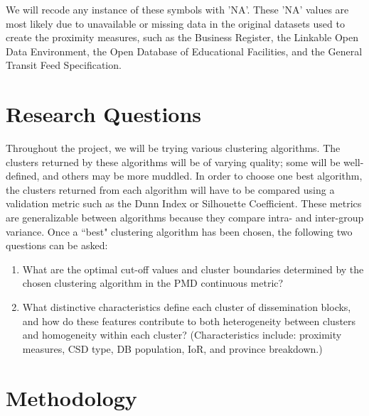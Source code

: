\documentclass[11pt, a4paper]{article}
\newcommand{\comment}[1]{}
\begin{document}
We will recode any instance of these symbols with 'NA'. These 'NA' values are most likely due to unavailable or missing data in the original datasets used to create the proximity measures, such as the Business Register, the Linkable Open Data Environment, the Open Database of Educational Facilities, and the General Transit Feed Specification. 



\section*{Research Questions}

Throughout the project, we will be trying various clustering algorithms. The clusters returned by these algorithms will be of varying quality; some will be well-defined, and others may be more muddled. In order to choose one best algorithm, the clusters returned from each algorithm will have to be compared using a validation metric such as the Dunn Index or Silhouette Coefficient. These metrics are generalizable between algorithms because they compare intra- and inter-group variance. Once a ``best" clustering algorithm has been chosen, the following two questions can be asked:

\begin{enumerate}
\item What are the optimal cut-off values and cluster boundaries determined by the chosen clustering algorithm in the PMD continuous metric? 
\item What distinctive characteristics define each cluster of dissemination blocks, and how do these features contribute to both heterogeneity between clusters and homogeneity within each cluster? (Characteristics include: proximity measures, CSD type, DB population, IoR, and province breakdown.) 
\end{enumerate}






\section*{Methodology}

\comment{
\subsection*{Data Investigation}
\subsection*{Statistical Analysis}
\subsection*{Visualization}
}
\end{document}
